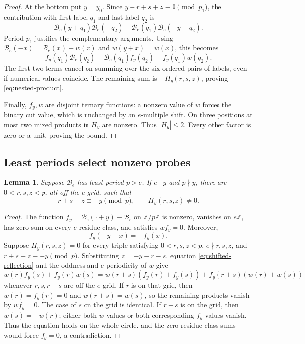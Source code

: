 \documentclass[11pt,a4paper]{amsart}
\numberwithin{equation}{section}
\theoremstyle{plain}
\newtheorem{lemma}[theorem]{Lemma}
\theoremstyle{definition}
\newcommand{\Z}{\mathbb Z}
\begin{document}
\begin{proof}
At the bottom put \(y=y_0\).  Since \(y+r+s+z\equiv0\pmod{p_1}\),
the contribution with first label \(q_1\) and last label \(q_2\) is
\[
\mathcal B_e(y+q_1)\mathcal B_e(-q_2)-\mathcal B_e(q_1)\mathcal B_e(-y-q_2).
\]
Period \(p_1\) justifies the complementary arguments.  Using
\(\mathcal B_e(-x)=\mathcal B_e(x)-w(x)\) and \(w(y+x)=w(x)\), this becomes
\[
f_y(q_1)\mathcal B_e(q_2)-\mathcal B_e(q_1)f_y(q_2)-f_y(q_1)w(q_2).
\]
The first two terms cancel on summing over the six ordered pairs of
labels, even if numerical values coincide.  The remaining sum is
\(-H_y(r,s,z)\), proving \eqref{eq:nested-product}.

Finally, \(f_y,w\) are disjoint ternary functions: a nonzero value of
\(w\) forces the binary cut value, which is unchanged by an
\(e\)-multiple shift.  On three positions at most two mixed products
in \(H_y\) are nonzero.  Thus \(|H_y|\le2\).  Every other factor is
zero or a unit, proving the bound.
\end{proof}

\subsection{Least periods select nonzero probes}

\begin{lemma}\label{lem:bottom}
Suppose \(\mathcal B_e\) has least period \(p>e\).  If \(e\mid y\) and \(p\nmid y\), there
are \(0<r,s,z<p\), all off the \(e\)-grid, such that
\begin{equation}\label{eq:bottom-probes}
r+s+z\equiv-y\pmod p,\qquad H_y(r,s,z)\ne0.
\end{equation}
\end{lemma}
\begin{proof}
The function \(f_y=\mathcal B_e(\cdot+y)-\mathcal B_e\) on \(\Z/p\Z\) is nonzero, vanishes
on \(e\Z\), has zero sum on every \(e\)-residue class, and satisfies \(wf_y=0\).
Moreover,
\begin{equation}\label{eq:shifted-reflection}
f_y(-y-x)=-f_y(x).
\end{equation}
Suppose \(H_y(r,s,z)=0\) for every triple satisfying
\(0<r,s,z<p\), \(e\nmid r,s,z\), and
\(r+s+z\equiv-y\pmod p\).  Substituting \(z=-y-r-s\), equation
\eqref{eq:shifted-reflection} and the oddness and \(e\)-periodicity of \(w\) give
\[
w(r)f_y(s)+f_y(r)w(s)
=w(r+s)(f_y(r)+f_y(s))+f_y(r+s)(w(r)+w(s))
\]
whenever \(r,s,r+s\) are off the \(e\)-grid.  If \(r\) is on that
grid, then \(w(r)=f_y(r)=0\) and \(w(r+s)=w(s)\), so the remaining
products vanish by \(wf_y=0\).  The case of \(s\) on the grid is
identical.  If \(r+s\) is on the grid, then \(w(s)=-w(r)\); either
both \(w\)-values or both corresponding \(f_y\)-values vanish.
Thus the equation holds on the whole circle.
 and the zero residue-class sums would force \(f_y=0\),
a contradiction.
\end{proof}
\end{document}
